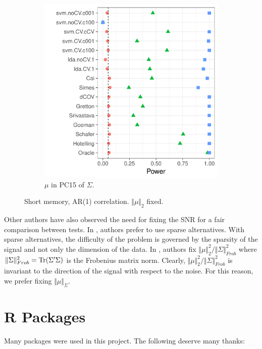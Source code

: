 \documentclass[oupdraft]{bio}
\begin{document}
\begin{figure}[h]
\begin{subfigure}[t]{0.45\columnwidth}
		\includegraphics[width=1\columnwidth]{"file31"}
		\caption{$\mu$ in PC15 of $\Sigma$.}  
		\label{fig:dependence_42}	
	\end{subfigure}
	\caption{Short memory, AR(1) correlation. $\Vert \mu \Vert_2$ fixed. }	
	\label{fig:dependence_4}		
\end{figure}

Other authors have also observed the need for fixing the SNR for a fair comparison between tests.
In \cite{ramdas2015decreasing}, authors prefer to use sparse alternatives.
With sparse alternatives, the difficulty of the problem is governed by the sparsity of the signal and not only the dimension of the data. 
In \cite{chen2010two}, authors fix $\Vert \mu \Vert_2^2/\Vert \Sigma \Vert^2_{Frob}$ where $\Vert \Sigma \Vert^2_{Frob}=\operatorname{Tr}(\Sigma'\Sigma)$ is the Frobenius matrix norm. 
Clearly, $\Vert \mu \Vert_2^2/\Vert \Sigma \Vert^2_{Frob}$ is invariant to the direction of the signal with respect to the noise. 
For this reason, we prefer fixing $\Vert \mu \Vert_\Sigma$.







\section{R Packages}

Many \R packages were used in this project. 
The following deserve many thanks:
\cite{mvtnorm,foreach,Hotelling,rpushbullet,sparsediscrim,glmnet,globaltest,kernlab,energy,hdtest}	



\newpage


\end{document}
